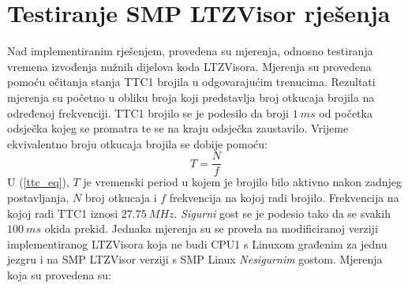 \documentclass[times, utf8, diplomski, numeric]{fer}
\begin{document}
\chapter{Testiranje SMP LTZVisor rješenja}
Nad implementiranim rješenjem, provedena su mjerenja, odnosno testiranja vremena izvođenja nužnih dijelova koda LTZVisora.
Mjerenja su provedena pomoću očitanja stanja TTC1 brojila u odgovarajućim trenucima. Rezultati mjerenja su početno u obliku
broja koji predstavlja broj otkucaja brojila na određenoj frekvenciji. TTC1 brojilo se je podesilo da broji $1~ms$ od
početka odsječka kojeg se promatra te se na kraju odsječka zaustavilo. Vrijeme ekvivalentno broju otkucaja brojila se dobije
pomoću:
\begin{equation}
  \label{ttc_eq}
  T=\frac{N}{f}
\end{equation}
U (\ref{ttc_eq}), $T$ je vremenski period u kojem je brojilo bilo aktivno nakon zadnjeg postavljanja, $N$ broj otkucaja
i $f$ frekvencija na kojoj radi brojilo. Frekvencija na kojoj radi TTC1 iznosi $27.75~MHz$. \textit{Sigurni} gost se je
podesio tako da se svakih $100~ms$ okida prekid. Jednaka mjerenja su se provela na modificiranoj verziji implementiranog
LTZVisora koja ne budi CPU1 s Linuxom građenim za jednu jezgru i na SMP LTZVisor verziji s SMP Linux \textit{Nesigurnim}
gostom. Mjerenja koja su provedena su:
\end{document}
